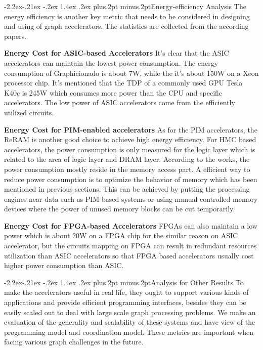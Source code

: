\documentclass[twoside]{article}
\makeatletter
\def\subsubsection{\@startsection{subsubsection}{3}{\z@}%
 {-2.2ex\@plus -.21ex \@minus -.2ex}%
 {1.4ex \@plus.2ex}
{\normalfont\normalsize\protect\baselineskip=12pt plus.2pt minus.2pt\sl}}
\makeatother
\begin{document}
\begin{multicols}{2}
\subsubsection{Energy-efficiency Analysis}
The energy efficiency is another key metric that needs to be considered in designing and using of graph accelerators. The statistics are collected from the according papers. 

{\bf Energy Cost for ASIC-based Accelerators} It's clear that the ASIC accelerators can maintain the lowest power consumption. The energy consumption of Graphicionado \cite{ham2016graphicionado} is about 7W, while the it's about 150W on a Xeon processor chip. It's mentioned that the TDP of a commonly used GPU Tesla K40c is 245W which consumes more power than the CPU and specific accelerators. The low power of ASIC accelerators come from the efficiently utilized circuits. 

{\bf Energy Cost for PIM-enabled accelerators} As for the PIM accelerators, the ReRAM is another good choice to achieve high energy efficiency. For HMC based accelerators, the power consumption is only measured for the logic layer which is related to the area of logic layer and DRAM layer. According to the works, the power consumption mostly reside in the memory access part. A efficient way to reduce power consumption is to optimize the behavior of memory which has been mentioned in previous sections. This can be achieved by putting the processing engines near data such as PIM based systems or using manual controlled memory devices where the power of unused memory blocks can be cut temporarily.

{\bf Energy Cost for FPGA-based Accelerators} FPGAs can also maintain a low power which is about 20W \cite{zhou2016highthroughput} on a FPGA chip for the similar reason on ASIC accelerator, but the circuits mapping on FPGA can result in redundant resources utilization than ASIC accelerators so that FPGA based accelerators usually cost higher power consumption than ASIC. 


\subsubsection{Analysis for Other Results}
To make the accelerators useful in real life, they ought to support various kinds of applications and provide efficient programming interfaces, besides they can be easily scaled out to deal with large scale graph processing problems. We make an evaluation of the generality and scalability of these systems and have view of the programming model and coordination model. These metrics are important when facing various graph challenges in the future. 


\end{multicols}
\end{document}
